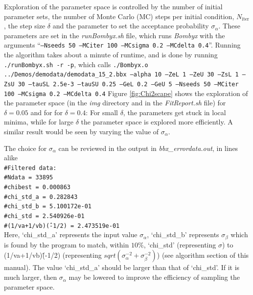\documentclass[  superscriptaddress]{revtex4}
\begin{document}
Exploration of the parameter space is controlled by the number of initial parameter sets, the number of Monte Carlo (MC) steps per initial condition, $N_\mathrm{iter}$, the step size $\delta$ and the parameter to set the acceptance probability $\sigma_\alpha$.
These parameters are set in the \emph{runBombyx.sh} file, which runs \emph{Bombyx} with the arguments ``\texttt{--Nseeds 50 --MCiter 100 --MCsigma 0.2 --MCdelta 0.4}''.
Running the algorithm takes about a minute of runtime, and is done by running \texttt{./runBombyx.sh -r -p}, which calls  \texttt{./Bombyx.o ../Demos/demodata/demodata\_15\_2.bbx --alpha 10 --ZeL 1 --ZeU 30 --ZsL 1 --ZsU 30 --tauSL 2.5e-3 --tauSU 0.25 --GeL 0.2 --GeU 5 --Nseeds 50 --MCiter 100 --MCsigma 0.2 --MCdelta 0.4}
 Figure \ref{fig:Chi2scape} shows the exploration of the parameter space (in the \emph{img} directory and in the \emph{FitReport.sh} file) for $\delta =0.05$ and for for $\delta =0.4$: For small $\delta$, the parameters get stuck in local minima, while for large $\delta$ the parameter space is explored more efficiently. A similar result would be seen by varying the value of $\sigma_\alpha$.

The choice for $\sigma_\alpha$ can be reviewed in the output in \emph{bbx\_errordata.out}, in lines alike\\
\texttt{\#Filtered data: }\\
\texttt{\#Ndata              = 33895}\\
\texttt{\#chibest            = 0.000863}\\
\texttt{\#chi\_std\_a          = 0.282843}\\
\texttt{\#chi\_std\_b          = 5.100172e-01}\\
\texttt{\#chi\_std            = 2.540926e-01}\\
\texttt{\#(1/va+1/vb)\^(-1/2) = 2.473519e-01}\\
Here, `chi\_std\_a' represents the input value $\sigma_\alpha$, `chi\_std\_b' represents $\sigma_\beta$ which is found by the program to match, within $10\%$, `chi\_std' (representing $\sigma$) to (1/va+1/vb)\^(-1/2) (representing $sqrt\left(\sigma_\alpha^{-2} + \sigma_\beta^{-2}\right)$) (see algorithm section of this manual).
The value `chi\_std\_a' should be larger than that of `chi\_std'. If it is much larger, then $\sigma_\alpha$ may be lowered to improve the efficiency of sampling the parameter space.
\end{document}
